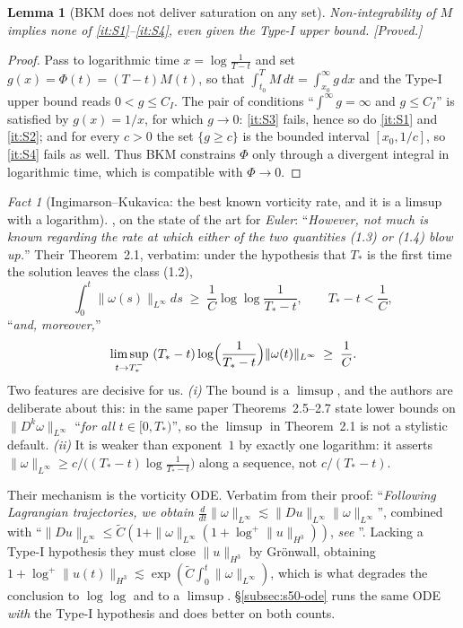 \documentclass[11pt]{article}
\newtheorem{lemma}[theorem]{Lemma}
\theoremstyle{definition}
\theoremstyle{remark}
\newtheorem{fact}[theorem]{Fact}
\begin{document}
\begin{lemma}[BKM does not deliver saturation on any set]
  \label{lem:s50-bkm-insufficient}
  Non-integrability of $M$ implies none of
  \ref{it:S1}--\ref{it:S4}, even given the Type-I upper bound.
  \emph{[Proved.]}
\end{lemma}
\begin{proof}
  Pass to logarithmic time $x=\log\frac1{T-t}$ and set
  $g(x)=\Phi(t)=(T-t)M(t)$, so that $\int_{t_0}^TM\,dt=\int_{x_0}^\infty g\,dx$
  and the Type-I upper bound reads $0<g\leq C_I$. The pair of conditions
  ``$\int^\infty g=\infty$ and $g\leq C_I$'' is satisfied by $g(x)=1/x$, for
  which $g\to0$: \ref{it:S3} fails, hence so do \ref{it:S1} and \ref{it:S2};
  and for every $c>0$ the set $\{g\geq c\}$ is the bounded interval
  $[x_0,1/c]$, so \ref{it:S4} fails as well. Thus BKM constrains $\Phi$ only
  through a divergent integral in logarithmic time, which is compatible with
  $\Phi\to0$.
\end{proof}

\begin{fact}[Ingimarson--Kukavica: the best known vorticity rate, and it is a
  limsup with a logarithm]\label{fact:s50-ik}
  \cite[§1]{IngimarsonKukavica2026}, on the state of the art for
  \emph{Euler}: ``\emph{However, not much is known regarding the rate at which
  either of the two quantities \textup{(1.3)} or \textup{(1.4)} blow up.}''
  Their Theorem~2.1, verbatim: under the hypothesis that $T_*$ is the first
  time the solution leaves the class \textup{(1.2)},
  \[
    \int_0^t\|\omega(s)\|_{L^\infty}ds
      \;\geq\; \frac1C\log\log\frac1{T_*-t},
    \qquad T_*-t<\frac1C,
  \]
  ``\emph{and, moreover,}''
  \[
    \limsup_{t\to T_*^-}\ (T_*-t)\log\Bigl(\frac1{T_*-t}\Bigr)
      \|\omega(t)\|_{L^\infty} \;\geq\; \frac1C .
  \]
  Two features are decisive for us. \emph{(i)} The bound is a $\limsup$, and
  the authors are deliberate about this: in the same paper
  Theorems~2.5--2.7 state lower bounds on $\|D^k\omega\|_{L^\infty}$
  ``\emph{for all $t\in[0,T_*)$}'', so the $\limsup$ in Theorem~2.1 is not a
  stylistic default. \emph{(ii)} It is weaker than exponent~$1$ by exactly one
  logarithm: it asserts
  $\|\omega\|_{L^\infty}\geq c/\bigl((T_*-t)\log\frac1{T_*-t}\bigr)$ along a
  sequence, not $c/(T_*-t)$.

  Their mechanism is the vorticity ODE. Verbatim from their proof:
  ``\emph{Following Lagrangian trajectories, we obtain}
  $\frac{d}{dt}\|\omega\|_{L^\infty}\lesssim\|Du\|_{L^\infty}
  \|\omega\|_{L^\infty}$'', combined with
  ``$\|Du\|_{L^\infty}\leq\widetilde C(1+\|\omega\|_{L^\infty}
  (1+\log^+\|u\|_{H^3}))$, \emph{see} \cite{KozonoTaniuchi2000}''. Lacking a
  Type-I hypothesis they must close $\|u\|_{H^3}$ by Gr\"onwall, obtaining
  $1+\log^+\|u(t)\|_{H^3}\lesssim\exp(\widetilde C\int_0^t\|\omega\|_{L^\infty})$,
  which is what degrades the conclusion to $\log\log$ and to a $\limsup$.
  §\ref{subsec:s50-ode} runs the same ODE \emph{with} the Type-I hypothesis and
  does better on both counts.
\end{fact}
\end{document}
